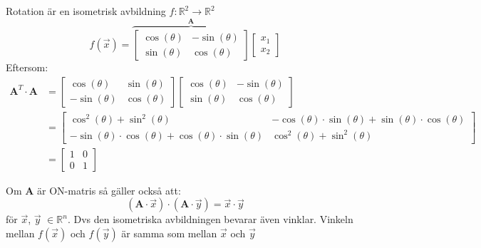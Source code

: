\begin{Ex}
	Rotation är en isometrisk avbildning $f:\mathbb{R}^2 \rightarrow \mathbb{R}^2$
	\[
	f(\vec{x}) =
	\overbrace{
	\begin{bmatrix}
		\cos(\theta) & -\sin(\theta)\\
		\sin(\theta) & \cos(\theta)
	\end{bmatrix}
	}^\mathbf{A}
	\begin{bmatrix} x_1\\x_2 \end{bmatrix}
	\]
	Eftersom:
	\begin{align*}
	\mathbf{A}^T \cdot \mathbf{A} &=
	\begin{bmatrix}
		\cos(\theta) & \sin(\theta)\\
		-\sin(\theta) & \cos(\theta)
	\end{bmatrix}
	\begin{bmatrix}
		\cos(\theta) & -\sin(\theta)\\
		\sin(\theta) & \cos(\theta)
	\end{bmatrix}
	\\
	&=
	\begin{bmatrix}
		\cos^2(\theta) + \sin^2(\theta) & -\cos(\theta) \cdot \sin(\theta) + \sin(\theta) \cdot \cos(\theta)\\
		-\sin(\theta) \cdot \cos(\theta) + \cos(\theta) \cdot \sin(\theta) & \cos^2(\theta) + \sin^2(\theta)
	\end{bmatrix}
	\\
	&=
	\begin{bmatrix} 1&0\\0&1 \end{bmatrix}
	\end{align*}
\end{Ex}
Om \textbf{A} är ON-matris så gäller också att:
\[
(\mathbf{A} \cdot \vec{x}) \cdot (\mathbf{A} \cdot \vec{y}) = \vec{x} \cdot \vec{y}
\]
för $\vec{x}$, $\vec{y}$ $\in \mathbb{R}^n$. Dvs den isometriska avbildningen bevarar även vinklar. Vinkeln mellan $f(\vec{x})$ och $f(\vec{y})$ är samma som mellan $\vec{x}$ och $\vec{y}$
